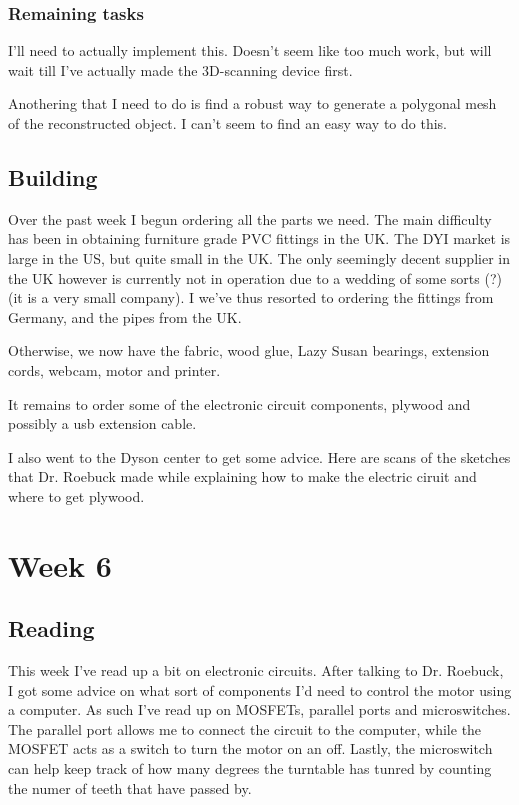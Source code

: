 \documentclass[a4paper]{article}
\begin{document}
\subsubsection{Remaining tasks}
I'll need to actually implement this. Doesn't seem like too much work, but will wait till I've actually made the 3D-scanning device first.

Anothering that I need to do is find a robust way to generate a polygonal mesh of the reconstructed object. I can't seem to find an easy way to do this.

\subsection{Building}
Over the past week I begun ordering all the parts we need.
The main difficulty has been in obtaining furniture grade PVC fittings in the UK.
The DYI market is large in the US, but quite small in the UK. 
The only seemingly decent supplier in the UK however is currently not in operation due to a wedding of some sorts (?) (it is a very small company).
I we've thus resorted to ordering the fittings from Germany, and the pipes from the UK.

Otherwise, we now have the fabric, wood glue, Lazy Susan bearings, extension cords, webcam, motor and printer.

It remains to order some of the electronic circuit components, plywood and possibly a usb extension cable.

I also went to the Dyson center to get some advice. Here are scans of the sketches that Dr. Roebuck made while explaining how to make the electric ciruit and where to get plywood.


\section{Week 6}

\subsection{Reading}
This week I've read up a bit on electronic circuits.
After talking to Dr. Roebuck, I got some advice on what sort of components I'd need to control the motor using a computer.
As such I've read up on MOSFETs, parallel ports and microswitches.
The parallel port allows me to connect the circuit to the computer, while the MOSFET acts as a switch to turn the motor on an off.
Lastly, the microswitch can help keep track of how many degrees the turntable has tunred by counting the numer of teeth that have passed by.
\end{document}
